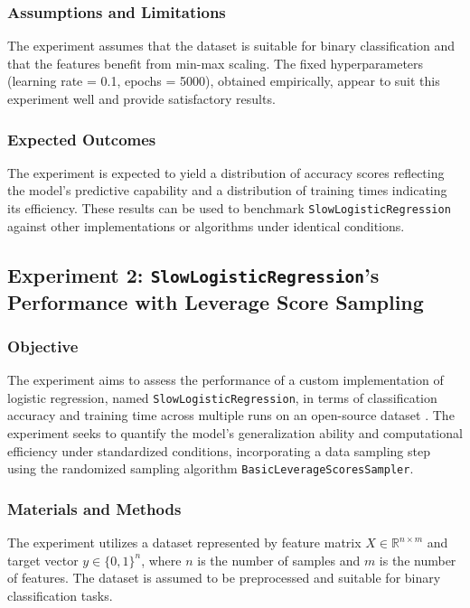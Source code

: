 \documentclass{article}
\theoremstyle{plain}
\theoremstyle{definition}
\theoremstyle{remark}
\begin{document}
\subsubsection{Assumptions and Limitations}

The experiment assumes that the dataset is suitable for binary classification and that the features benefit from min-max scaling. The fixed hyperparameters (learning rate = 0.1, epochs = 5000), obtained empirically, appear to suit this experiment well and provide satisfactory results.


\subsubsection{Expected Outcomes}

The experiment is expected to yield a distribution of accuracy scores reflecting the model's predictive capability and a distribution of training times indicating its efficiency. These results can be used to benchmark \texttt{SlowLogisticRegression} against other implementations or algorithms under identical conditions.



\subsection{Experiment 2: \texttt{SlowLogisticRegression}'s Performance with Leverage Score Sampling}

\subsubsection{Objective}

The experiment aims to assess the performance of a custom implementation of logistic regression, named \texttt{SlowLogisticRegression}, in terms of classification accuracy and training time across multiple runs on an open-source dataset \cite{breastcancer}. The experiment seeks to quantify the model's generalization ability and computational efficiency under standardized conditions, incorporating a data sampling step using the randomized sampling algorithm \texttt{BasicLeverageScoresSampler}.


\subsubsection{Materials and Methods}

The experiment utilizes a dataset represented by feature matrix $ X \in \mathbb{R}^{n \times m} $ and target vector $ y \in \{0, 1\}^n $, where $ n $ is the number of samples and $ m $ is the number of features. The dataset is assumed to be preprocessed and suitable for binary classification tasks.
\end{document}
